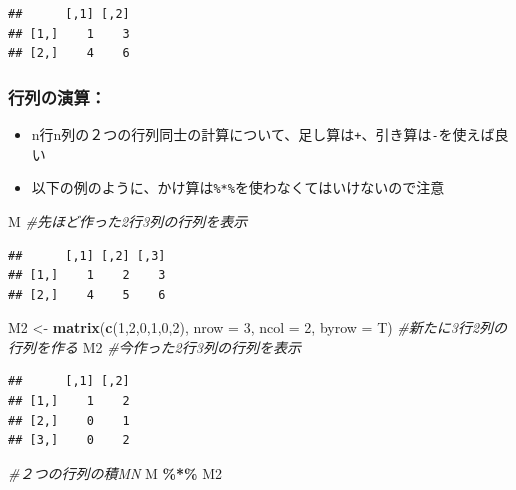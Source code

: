 \documentclass[
]{book}
\newenvironment{Shaded}{\begin{snugshade}}{\end{snugshade}}
\newcommand{\AttributeTok}[1]{\textcolor[rgb]{0.13,0.29,0.53}{#1}}
\newcommand{\CommentTok}[1]{\textcolor[rgb]{0.56,0.35,0.01}{\textit{#1}}}
\newcommand{\DecValTok}[1]{\textcolor[rgb]{0.00,0.00,0.81}{#1}}
\newcommand{\FunctionTok}[1]{\textcolor[rgb]{0.13,0.29,0.53}{\textbf{#1}}}
\newcommand{\NormalTok}[1]{#1}
\newcommand{\OtherTok}[1]{\textcolor[rgb]{0.56,0.35,0.01}{#1}}
\newcommand{\SpecialCharTok}[1]{\textcolor[rgb]{0.81,0.36,0.00}{\textbf{#1}}}
\providecommand{\tightlist}{%
  \setlength{\itemsep}{0pt}\setlength{\parskip}{0pt}}
\begin{document}
\begin{verbatim}
##      [,1] [,2]
## [1,]    1    3
## [2,]    4    6
\end{verbatim}

\hypertarget{ux884cux5217ux306eux6f14ux7b97}{%
\subsubsection*{行列の演算：}\label{ux884cux5217ux306eux6f14ux7b97}}

\begin{itemize}
\tightlist
\item
  n行n列の２つの行列同士の計算について、足し算は\texttt{+}、引き算は\texttt{-}を使えば良い
\item
  以下の例のように、かけ算は\texttt{\%*\%}を使わなくてはいけないので注意
\end{itemize}

\begin{Shaded}
\begin{Highlighting}[]
\NormalTok{M }\CommentTok{\#先ほど作った2行3列の行列を表示}
\end{Highlighting}
\end{Shaded}

\begin{verbatim}
##      [,1] [,2] [,3]
## [1,]    1    2    3
## [2,]    4    5    6
\end{verbatim}

\begin{Shaded}
\begin{Highlighting}[]
\NormalTok{M2 }\OtherTok{\textless{}{-}} \FunctionTok{matrix}\NormalTok{(}\FunctionTok{c}\NormalTok{(}\DecValTok{1}\NormalTok{,}\DecValTok{2}\NormalTok{,}\DecValTok{0}\NormalTok{,}\DecValTok{1}\NormalTok{,}\DecValTok{0}\NormalTok{,}\DecValTok{2}\NormalTok{), }\AttributeTok{nrow =} \DecValTok{3}\NormalTok{, }\AttributeTok{ncol =} \DecValTok{2}\NormalTok{, }\AttributeTok{byrow =}\NormalTok{ T) }\CommentTok{\#新たに3行2列の行列を作る}
\NormalTok{M2 }\CommentTok{\#今作った2行3列の行列を表示}
\end{Highlighting}
\end{Shaded}

\begin{verbatim}
##      [,1] [,2]
## [1,]    1    2
## [2,]    0    1
## [3,]    0    2
\end{verbatim}

\begin{Shaded}
\begin{Highlighting}[]
\CommentTok{\#２つの行列の積MN}
\NormalTok{M }\SpecialCharTok{\%*\%}\NormalTok{ M2 }
\end{Highlighting}
\end{Shaded}
\end{document}
